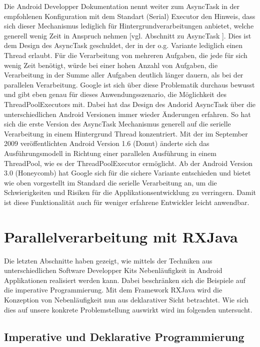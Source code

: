 \documentclass[12pt,oneside,a4paper,bibtotoc,liststotoc]{scrreprt}
\begin{document}
Die Android Developper Dokumentation nennt weiter zum AsyncTask in der empfohlenen Konfiguration mit dem Standart (Serial) Executor den Hinweis, dass sich dieser Mechanismus lediglich für Hintergrundverarbeitungen anbietet, welche generell wenig Zeit in Anspruch nehmen  [vgl. Abschnitt zu AsyncTask \citet{androidDevDocu}]. Dies ist dem Design des AsyncTask geschuldet, der in der o.g. Variante lediglich einen Thread erlaubt. Für die Verarbeitung von mehreren Aufgaben, die jede für sich wenig Zeit benötigt, würde bei einer hohen Anzahl von Aufgaben, die Verarbeitung in der Summe aller Aufgaben deutlich länger dauern, als bei der parallelen Verarbeitung. Google ist sich über diese Problematik durchaus bewusst und gibt eben genau für dieses Anwendungsszenario, die Möglichkeit des ThreadPoolExecutors mit. Dabei hat das Design des Andorid AsyncTask über die unterschiedlichen Android Versionen immer wieder Änderungen erfahren. So hat sich die erste Version des AsyncTask Mechanismus generell auf die serielle Verarbeitung in einem Hintergrund Thread konzentriert. Mit der im September 2009 veröffentlichten Android Version 1.6 (Donut) änderte sich das Ausführungsmodell in Richtung einer parallelen Ausführung in einem ThreadPool, wie es der ThreadPoolExecutor ermöglicht. Ab der Android Version 3.0 (Honeycomb) hat Google sich für die sichere Variante entschieden und bietet wie oben vorgestellt im Standard die serielle Verarbeitung an, um die Schwierigkeiten und Risiken für die Applikationsentwicklung zu verringern. Damit ist diese Funktionalität auch für weniger erfahrene Entwickler leicht anwendbar.


\section{Parallelverarbeitung mit RXJava}
Die letzten Abschnitte haben gezeigt, wie mittels der Techniken aus unterschiedlichen Software Developper Kits Nebenläufigkeit in Android Applikationen realisiert werden kann. Dabei beschränken sich die Beispiele auf die imperative Programmierung. Mit dem Framework RXJava wird die Konzeption von Nebenläufigkeit nun aus deklarativer Sicht betrachtet. Wie sich dies auf unsere konkrete Problemstellung auswirkt wird im folgenden untersucht.
\subsection{Imperative und Deklarative Programmierung}
\end{document}
